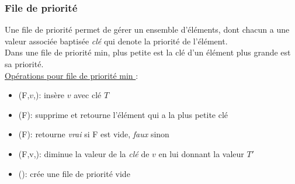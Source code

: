 
%     

   \begin{frame}
     \frametitle{File de priorité}
 Une file de priorité permet de gérer un ensemble d’éléments, dont chacun a une valeur associée  baptisée \emph{clé} qui denote la priorité de l'élément.\\ Dans une file de priorité min, plus petite est la clé d'un élément plus grande est sa priorité. \\ 
   \underline{Opérations pour file de priorité min }:
   \begin{itemize}
     \item {}(F,$v$,): insère  $v$ avec clé  $T$
     \item {}(F): supprime et retourne l'élément qui a la plus petite clé 
     \item {}(F): retourne \emph{vrai} si F  est vide, \emph{faux} sinon
     \item {}(F,v,): diminue la valeur de la \emph{clé} de $v$ en lui donnant la valeur $T'$
     \item {}(): crée une file de priorité vide 
     \end{itemize}
 \end{frame}

